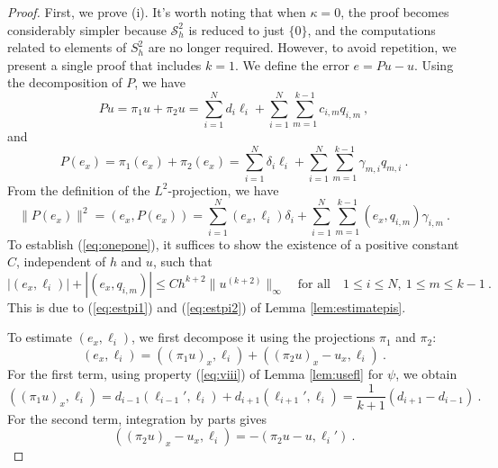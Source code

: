 \documentclass{amsart}
\begin{document}
\begin{proof}
First, we prove (i). It’s worth noting that when $\kappa=0$, the proof becomes considerably simpler because $\mathcal{S}_h^2$ is reduced to just $\{0\}$, and the computations related to elements of $S_h^2$ are no longer required. However, to avoid repetition, we present a single proof that includes $k=1$. We define the error $e=Pu-u$. Using the decomposition of $P$, we have
$$Pu=\pi_1u+\pi_2u = \sum_{i=1}^N d_i \ell_i+\sum_{i=1}^N\sum_{m=1}^{k-1} c_{i,m}q_{i,m}\ ,$$
and
$$P(e_x)=\pi_1(e_x)+\pi_2(e_x)=\sum_{i=1}^N\delta_i\ell_i+\sum_{i=1}^N\sum_{m=1}^{k-1}\gamma_{m,i}q_{m,i}\ .$$
From the definition of the $L^2$-projection, we have
$$\|P(e_x)\|^2=(e_x,P(e_x))=\sum_{i=1}^N(e_x,\ell_i)\delta_i+\sum_{i=1}^N\sum_{m=1}^{k-1}(e_x,q_{i,m})\gamma_{i,m}\ .$$
%
To establish (\ref{eq:onepone}), it suffices to show the existence of a positive constant $C$, independent of $h$ and $u$, such that
$$|(e_x,\ell_i)|+|(e_x,q_{i,m})|\leq C h^{k+2}\|u^{(k+2)}\|_\infty \quad \text{for all}\quad 1\leq i\leq N, ~ 1\leq m\leq k-1\ .$$
This is due to (\ref{eq:estpi1}) and (\ref{eq:estpi2}) of Lemma \ref{lem:estimatepis}.

To estimate $(e_x,\ell_i)$, we first decompose it using the projections $\pi_1$ and $\pi_2$:
\begin{equation}\label{eq:threepone}
(e_x,\ell_i)=((\pi_1u)_x,\ell_i)+((\pi_2u)_x-u_x,\ell_i)\ .
\end{equation}
%
For the first term, using property (\ref{eq:viii}) of Lemma \ref{lem:usefl} for $\psi$, we obtain
\begin{equation}\label{eq:threeptwo}
((\pi_1u)_x,\ell_i)=d_{i-1}(\ell_{i-1}',\ell_i)+d_{i+1}(\ell_{i+1}',\ell_i)=\frac{1}{k+1}(d_{i+1}-d_{i-1})\ .
\end{equation}
%
For the second term, integration by parts gives
$$((\pi_2u)_x-u_x,\ell_i)=-(\pi_2 u-u,\ell_i')\ .$$


\end{proof}
\end{document}
